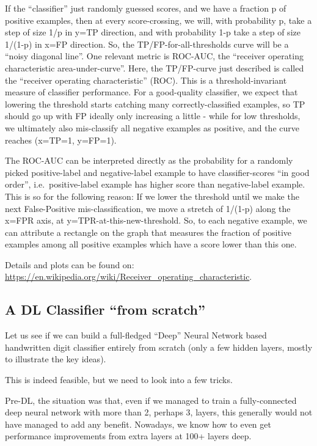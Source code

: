 \documentclass[11pt]{article}
\begin{document}
If the ``classifier'' just randomly guessed scores, and we have a
fraction p of positive examples, then at every score-crossing, we will,
with probability p, take a step of size 1/p in y=TP direction, and with
probability 1-p take a step of size 1/(1-p) in x=FP direction. So, the
TP/FP-for-all-thresholds curve will be a ``noisy diagonal line''. One
relevant metric is ROC-AUC, the ``receiver operating characteristic
area-under-curve''. Here, the TP/FP-curve just described is called the
``receiver operating characteristic'' (ROC). This is a
threshold-invariant measure of classifier performance. For a
good-quality classifier, we expect that lowering the threshold starts
catching many correctly-classified examples, so TP should go up with FP
ideally only increasing a little - while for low thresholds, we
ultimately also mis-classify all negative examples as positive, and the
curve reaches (x=TP=1, y=FP=1).

The ROC-AUC can be interpreted directly as the probability for a
randomly picked positive-label and negative-label example to have
classifier-scores ``in good order'', i.e.~positive-label example has
higher score than negative-label example. This is so for the following
reason: If we lower the threshold until we make the next False-Positive
mis-classification, we move a stretch of 1/(1-p) along the x=FPR axis,
at y=TPR-at-this-new-threshold. So, to each negative example, we can
attribute a rectangle on the graph that measures the fraction of
positive examples among all positive examples which have a score lower
than this one.

Details and plots can be found on:
\url{https://en.wikipedia.org/wiki/Receiver_operating_characteristic}.

    \hypertarget{a-dl-classifier-from-scratch}{%
\subsection{A DL Classifier ``from
scratch''}\label{a-dl-classifier-from-scratch}}

Let us see if we can build a full-fledged ``Deep'' Neural Network based
handwritten digit classifier entirely from scratch (only a few hidden
layers, mostly to illustrate the key ideas).

This is indeed feasible, but we need to look into a few tricks.

Pre-DL, the situation was that, even if we managed to train a
fully-connected deep neural network with more than 2, perhaps 3, layers,
this generally would not have managed to add any benefit. Nowadays, we
know how to even get performance improvements from extra layers at 100+
layers deep.
\end{document}
